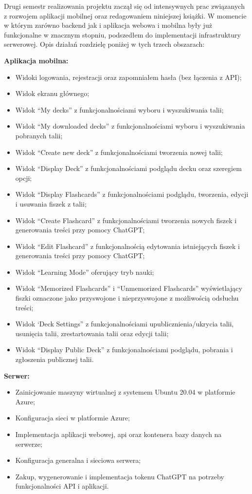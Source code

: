\par Drugi semestr realizowania projektu zaczął się od intensywnych prac związanych z rozwojem aplikacji mobilnej oraz
redagowaniem niniejszej książki. W momencie w którym zarówno backend jak i aplikacja webowa i mobilna były już
funkcjonalne w znacznym stopniu, podszedłem do implementacji infrastruktury serwerowej. Opis działań rozdzielę poniżej
w tych trzech obszarach:


\textbf{Aplikacja mobilna:}

\begin{itemize}
    \item Widoki logowania, rejestracji oraz zapomniałem hasła (bez łączenia z API);
    \item Widok ekranu głównego;
    \item Widok “My decks” z funkcjonalnościami wyboru i wyszukiwania talii;
    \item Widok “My downloaded decks” z funkcjonalnościami wyboru i wyszukiwania pobranych talii;
    \item Widok “Create new deck” z funkcjonalnościami tworzenia nowej talii;
    \item Widok “Display Deck” z funkcjonalnościami podglądu decku oraz szeregiem opcji;
    \item Widok “Display Flashcards” z funkcjonalnościami podglądu, tworzenia, edycji i usuwania fiszek z talii;
    \item Widok “Create Flashcard” z funkcjonalnościami tworzenia nowych fiszek i generowania treści przy pomocy ChatGPT;
    \item Widok “Edit Flashcard” z funkcjonalnością edytowania istniejących fiszek i generowania treści przy pomocy ChatGPT;
    \item Widok “Learning Mode” oferujący tryb nauki;
    \item Widok “Memorized Flashcards” i “Unmemorized Flashcards” wyświetlający fiszki oznaczone jako przyswojone i nieprzyswojone z możliwością odsłuchu treści;
    \item Widok ‘Deck Settings” z funkcjonalnościami upublicznienia/ukrycia talii, usunięcia talii, zrestartowania talii oraz edycji talii;
    \item Widok “Display Public Deck” z funkcjonalnościami podglądu, pobrania i zgłoszenia publicznej talii.
\end{itemize}

\textbf{Serwer:}

\begin{itemize}
    \item Zainicjowanie maszyny wirtualnej z systemem Ubuntu 20.04 w platformie Azure;
    \item Konfiguracja sieci w platformie Azure;
    \item Implementacja aplikacji webowej, api oraz kontenera bazy danych na serwerze;
    \item Konfiguracja generalna i sieciowa serwera;
    \item Zakup, wygenerowanie i implementacja tokenu ChatGPT na potrzeby funkcjonalności API i aplikacji.
\end{itemize}

